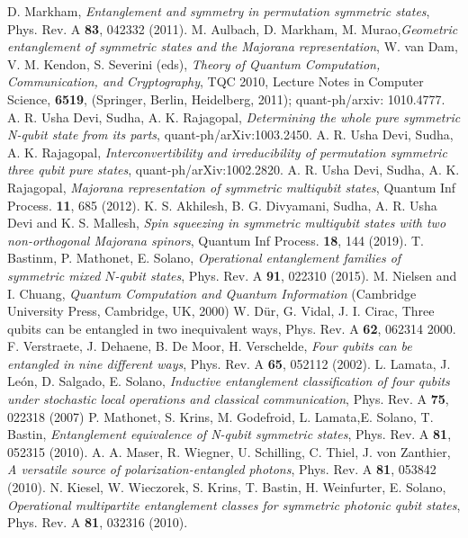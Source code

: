 \documentclass[pra,preprint,a4paper,superscriptaddress]{revtex4}
\begin{document}
{\begin{thebibliography}{0}
 D. Markham, {\em Entanglement and symmetry in permutation symmetric states}, Phys. Rev. A 
{\bf 83}, 042332 (2011).
 M. Aulbach,  D. Markham, M. Murao,{\em Geometric entanglement of symmetric states and the Majorana representation}, W. van Dam, V. M. Kendon, S. Severini (eds), {\em Theory of Quantum Computation, Communication, and Cryptography}, TQC 2010, Lecture Notes in Computer Science, {\bf 6519}, (Springer, Berlin, Heidelberg, 2011); quant-ph/arxiv: 1010.4777.
 A. R. Usha Devi,  Sudha, A. K. Rajagopal, {\em Determining the whole pure symmetric N-qubit state from its parts},  quant-ph/arXiv:1003.2450.
 A. R. Usha Devi,  Sudha, A. K. Rajagopal, {\em Interconvertibility and irreducibility of permutation symmetric three qubit pure states},
quant-ph/arXiv:1002.2820. 
 A. R. Usha Devi,  Sudha, A. K. Rajagopal, {\em  Majorana representation of symmetric multiqubit states}, Quantum Inf Process. {\bf 11}, 685 (2012).
 K. S. Akhilesh, B. G. Divyamani, Sudha, A. R. Usha Devi and K. S. Mallesh, {\em Spin squeezing in symmetric multiqubit states with two non-orthogonal Majorana spinors}, Quantum Inf Process. {\bf 18}, 144 (2019).  
 T. Bastinm, P. Mathonet, E. Solano, {\em Operational entanglement families of symmetric mixed $N$-qubit states}, Phys. Rev. A {\bf 91}, 022310 (2015).   
 M. Nielsen and I. Chuang, {\em Quantum Computation
	and Quantum Information} (Cambridge University Press,
Cambridge, UK, 2000)
 W. D{\"u}r,  G. Vidal, J. I. Cirac, {Three qubits can be entangled in two inequivalent ways}, Phys. Rev. A {\bf 62}, 062314 2000.
 F. Verstraete, J.  Dehaene, B. De Moor, H. Verschelde, {\em Four qubits can be entangled in nine different ways}, Phys. Rev. A  {\bf 65}, 052112  (2002).
 L. Lamata, J. Le{\'o}n, D. Salgado, E. Solano, {\em Inductive entanglement classification of four qubits under stochastic local operations
	and classical communication}, Phys. Rev. A {\bf 75}, 022318 (2007)
 P. Mathonet, S. Krins, M. Godefroid, L. Lamata,E. Solano,  T. Bastin, {\em Entanglement equivalence of N-qubit symmetric states},  Phys. Rev. A {\bf 81}, 052315  (2010).
  A. A. Maser, R. Wiegner, U. Schilling, C. Thiel, J. von Zanthier, {\em A versatile source of polarization-entangled photons},  Phys. Rev. A {\bf 81}, 
053842 (2010).
 N. Kiesel, W. Wieczorek,  S. Krins,  T. Bastin,  H. Weinfurter,  E. Solano, {\em Operational multipartite entanglement classes for symmetric photonic qubit states}, Phys. Rev. A {\bf 81}, 032316 (2010).

\end{thebibliography}}
\end{document}
